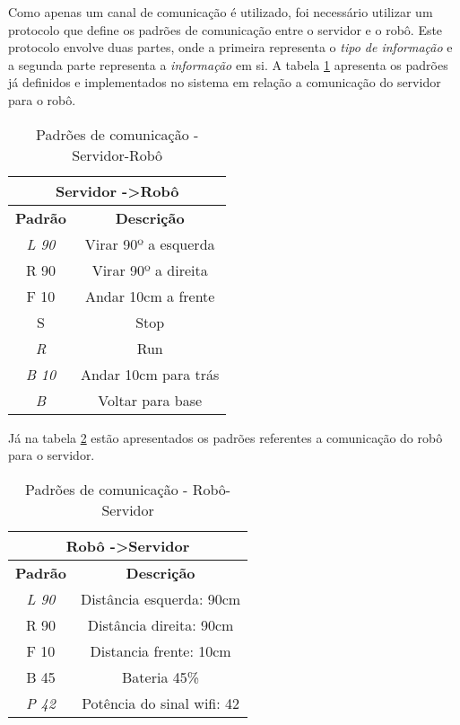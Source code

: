 		Como apenas um canal de comunicação é utilizado, foi necessário utilizar um protocolo que define os padrões de comunicação entre o servidor e o robô. Este protocolo envolve duas partes, onde a primeira representa o \textit{tipo de informação} e a segunda parte representa a \textit{informação} em si. A tabela \ref{tab:protocolo_comunicacao1} apresenta os padrões já definidos e implementados no sistema em relação a comunicação do servidor para o robô.

		\begin{table}[H]
		\centering
		\caption{Padrões de comunicação - Servidor-Robô}
		\label{tab:protocolo_comunicacao1}
		\begin{tabular}{|c|c|}
		\hline
		\multicolumn{2}{|c|}{\textbf{Servidor -\textgreater Robô}} \\ \hline
		\textbf{Padrão}           & \textbf{Descrição}             \\ \hline
		\textit{L 90}             & Virar 90º a esquerda           \\ \hline
		R 90                      & Virar 90º a direita            \\ \hline
		F 10                      & Andar 10cm a frente            \\ \hline
		S                         & Stop                           \\ \hline
		\textit{R}                & Run                            \\ \hline
		\textit{B 10}             & Andar 10cm para trás           \\ \hline
		\textit{B}                & Voltar para base               \\ \hline
		\end{tabular}
		\end{table}

		Já na tabela \ref{tab:protocolo_comunicacao2} estão apresentados os padrões referentes a comunicação do robô para o servidor.

		\begin{table}[H]
		\centering
		\caption{Padrões de comunicação - Robô-Servidor}
		\label{tab:protocolo_comunicacao2}
		\begin{tabular}{|c|c|}
		\hline
		\multicolumn{2}{|c|}{\textbf{Robô -\textgreater Servidor}} \\ \hline
		\textbf{Padrão}        & \textbf{Descrição}                \\ \hline
		\textit{L 90}          & Distância esquerda: 90cm          \\ \hline
		R 90                   & Distância direita: 90cm           \\ \hline
		F 10                   & Distancia frente: 10cm            \\ \hline
		B 45                   & Bateria 45\%                      \\ \hline
		\textit{P 42}          & Potência do sinal wifi: 42        \\ \hline
		\end{tabular}
		\end{table}

